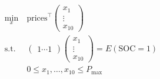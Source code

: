 \documentclass[preview]{standalone}
\begin{document}
\begin{align*}
\begin{aligned}\min_{x} &\ \text{prices}^\top \begin{pmatrix} x_1\\ \vdots\\ x_{10} \end{pmatrix} \\\text{s.t.} &\ \begin{pmatrix} 1 \cdots 1 \end{pmatrix} \begin{pmatrix} x_1\\ \vdots\\ x_{10} \end{pmatrix} = E\left(\text{SOC}=1\right) \\&\ 0 \leq x_1, \ldots , x_{10} \leq P_\text{max} \end{aligned}
\end{align*}
\end{document}
